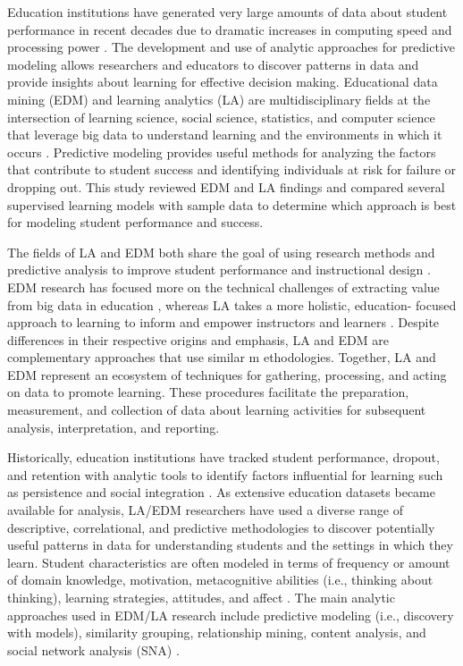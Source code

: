 \documentclass[sigconf]{acmart}
\begin{document}
Education institutions have generated very large amounts of data about student 
performance in recent decades due to dramatic increases in computing speed 
and processing power \cite{daniel15, daniel16}. The development and use of 
analytic approaches for predictive modeling allows researchers and educators  
to discover patterns in data and provide insights about learning for effective 
decision making. Educational data mining (EDM) and learning analytics (LA) are 
multidisciplinary fields at the intersection of learning science, social science, 
statistics, and computer science that leverage big data to understand learning 
and the environments in which it occurs \cite{siemens13, siemensbaker12}. 
Predictive modeling provides useful methods for analyzing the factors that 
contribute to student success and identifying individuals at risk for failure
or dropping out. This study reviewed EDM and LA findings and compared several 
supervised learning models with sample data to determine which approach is 
best for modeling student performance and success. 


The fields of LA and EDM both share the goal of using research methods and
predictive analysis to improve student performance and instructional design 
\cite{baker09, ferguson12, lester19}. EDM research has focused more on the 
technical challenges of extracting value from big data in education 
\cite{penaAyala14, romero10}, whereas LA takes a more holistic, education-
focused approach to learning to inform and empower instructors and learners 
\cite{lang17, papamitsiou14}. Despite differences in their respective origins 
and emphasis, LA and EDM are complementary approaches that use similar m
ethodologies. Together, LA and EDM represent an ecosystem of techniques for 
gathering, processing, and acting on data to promote learning. These procedures 
facilitate the preparation, measurement, and collection of data about learning 
activities for subsequent analysis, interpretation, and reporting. 


Historically, education institutions have tracked student performance, dropout, 
and retention with analytic tools to identify factors influential for learning 
such as persistence and social integration \cite{ferguson12}. As extensive 
education datasets became available for analysis, LA/EDM researchers have used 
a diverse range of descriptive, correlational, and predictive methodologies to 
discover potentially useful patterns in data for understanding students and 
the settings in which they learn. Student characteristics are often modeled 
in terms of frequency or amount of domain knowledge, motivation, metacognitive
abilities (i.e., thinking about thinking), learning strategies, attitudes, and 
affect \cite{Papamitsiou14}. The main analytic approaches used in EDM/LA 
research include predictive modeling (i.e., discovery with models), similarity 
grouping, relationship mining, content analysis, and social network analysis 
(SNA) \cite{bakerYucef09}. 
\end{document}
